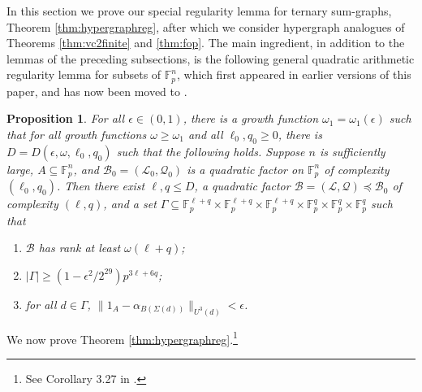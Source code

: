 \documentclass[12pt,oneside,british,a4wide]{amsart}
\newtheorem{proposition}[theorem]{Proposition}
\numberwithin{equation}{section}
\theoremstyle{definition}
\def\F{\mathbb{F}}
\def\e{\epsilon}
\newcommand{\calL}{\mathcal{L}}
\newcommand{\calB}{\mathcal{B}}
\newcommand{\calQ}{\mathcal{Q}}
\begin{document}
In this section we prove our special regularity lemma for ternary sum-graphs, Theorem \ref{thm:hypergraphreg}, after which we consider hypergraph analogues of Theorems \ref{thm:vc2finite} and \ref{thm:fop}.   The main ingredient, in addition to the lemmas of the preceding subsections, is  the following general quadratic arithmetic regularity lemma for subsets of $\F_p^n$, which first appeared in earlier versions of this paper, and has now been moved to \cite[Proposition 4.2]{Terry.2021d}.

 \begin{proposition}\label{prop:unifatom2}
 For all $\e\in (0,1)$, there is a growth function $\omega_1=\omega_1(\e)$ such that for all growth functions $\omega\geq\omega_1$ and all $\ell_0,q_0\geq 0$, there is $D=D(\e,\omega,\ell_0,q_0)$ such that the following holds.  Suppose $n$ is sufficiently large, $A\subseteq \F_p^n$, and $\calB_0=(\calL_0,\calQ_0)$ is a quadratic factor on $\F_p^n$ of complexity $(\ell_0,q_0)$. Then there exist $\ell,q\leq D$, a quadratic factor $\calB=(\calL,\calQ)\preceq \calB_0$ of complexity $(\ell, q)$, and a set $\Gamma\subseteq \mathbb{F}_p^{\ell+q}\times \mathbb{F}_p^{\ell+q}\times\mathbb{F}_p^{\ell+q}\times\mathbb{F}_p^{q}\times\mathbb{F}_p^{q}\times\mathbb{F}_p^{q}$ such that 
\begin{enumerate}[label=\normalfont(\roman*)]
\item  $\calB$ has rank at least $\omega(\ell+q)$;
\item $|\Gamma|\geq (1-\e^{2}/2^{29})p^{3\ell+6q}$;
\item for all $d\in \Gamma$, $\|1_A-\alpha_{B(\Sigma(d))}\|_{U^3(d)}<\e$.
\end{enumerate}
\end{proposition}

We now prove Theorem \ref{thm:hypergraphreg}.\footnote{See Corollary 3.27 in \cite{Terry.2021av2}.}  

\vspace{3mm}
\end{document}
